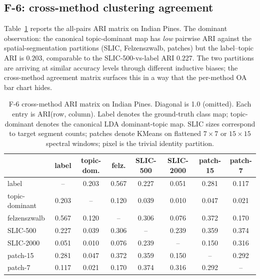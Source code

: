 \documentclass[journal,a4paper,10pt]{IEEEtran}
\begin{document}
\subsection{F-6: cross-method clustering agreement}

Table~\ref{tab:b6-cross-method} reports the all-pairs ARI matrix on
Indian Pines. The dominant observation: the canonical topic-dominant
map has \emph{low} pairwise ARI against the spatial-segmentation
partitions (SLIC, Felzenszwalb, patches) but the label--topic ARI is
$0.203$, comparable to the SLIC-500-vs-label ARI $0.227$. The two
partitions are arriving at similar accuracy levels through different
inductive biases; the cross-method agreement matrix surfaces this in
a way that the per-method OA bar chart hides.

\begin{table}[t]
\caption{F-6 cross-method ARI matrix on Indian Pines. Diagonal is
1.0 (omitted). Each entry is ARI(row, column). Label denotes the
ground-truth class map; topic-dominant denotes the canonical LDA
dominant-topic map. SLIC sizes correspond to target segment counts;
patches denote KMeans on flattened $7\times7$ or $15\times15$
spectral windows; pixel is the trivial identity partition.}
\label{tab:b6-cross-method}
\centering
\small
\begin{tabular}{lccccccc}
\toprule
                  & label & topic-dom. & felz. & SLIC-500 & SLIC-2000 & patch-15 & patch-7 \\
\midrule
label             & --    & 0.203      & 0.567 & 0.227    & 0.051     & 0.281    & 0.117 \\
topic-dominant    & 0.203 & --         & 0.120 & 0.039    & 0.010     & 0.047    & 0.021 \\
felzenszwalb      & 0.567 & 0.120      & --    & 0.306    & 0.076     & 0.372    & 0.170 \\
SLIC-500          & 0.227 & 0.039      & 0.306 & --       & 0.239     & 0.359    & 0.374 \\
SLIC-2000         & 0.051 & 0.010      & 0.076 & 0.239    & --        & 0.150    & 0.316 \\
patch-15          & 0.281 & 0.047      & 0.372 & 0.359    & 0.150     & --       & 0.292 \\
patch-7           & 0.117 & 0.021      & 0.170 & 0.374    & 0.316     & 0.292    & -- \\
\bottomrule
\end{tabular}
\end{table}
\end{document}
